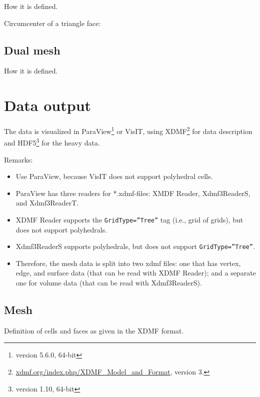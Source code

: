 \documentclass{article}
\begin{document}
How it is defined.

Circumcenter of a triangle face: \\




\subsection{Dual mesh}

How it is defined.



\section{Data output}

The data is visualized in ParaView\footnote{version 5.6.0, 64-bit} 
or VisIT, 
using XDMF\footnote{\url{xdmf.org/index.php/XDMF_Model_and_Format}, version 3.} 
for data description and HDF5\footnote{version 1.10, 64-bit} 
for the heavy data.

Remarks:
\begin{itemize}
\item Use ParaView, because VisIT does not support polyhedral cells.

\item ParaView has three readers for *.xdmf-files: XMDF Reader, Xdmf3ReaderS, and Xdmf3ReaderT. 

\item XDMF Reader supports the \texttt{GridType=''Tree''} tag (i.e., grid of grids), but does not support polyhedrals.

\item Xdmf3ReaderS supports polyhedrals, but does not support \texttt{GridType=''Tree''}.

\item Therefore, the mesh data is split into two xdmf files: one that has vertex, edge, and surface data (that can be read with XDMF Reader); and a separate one for volume data (that can be read with Xdmf3ReaderS).

\end{itemize}







\subsection{Mesh}

Definition of cells and faces as given in the XDMF format. 
\end{document}
